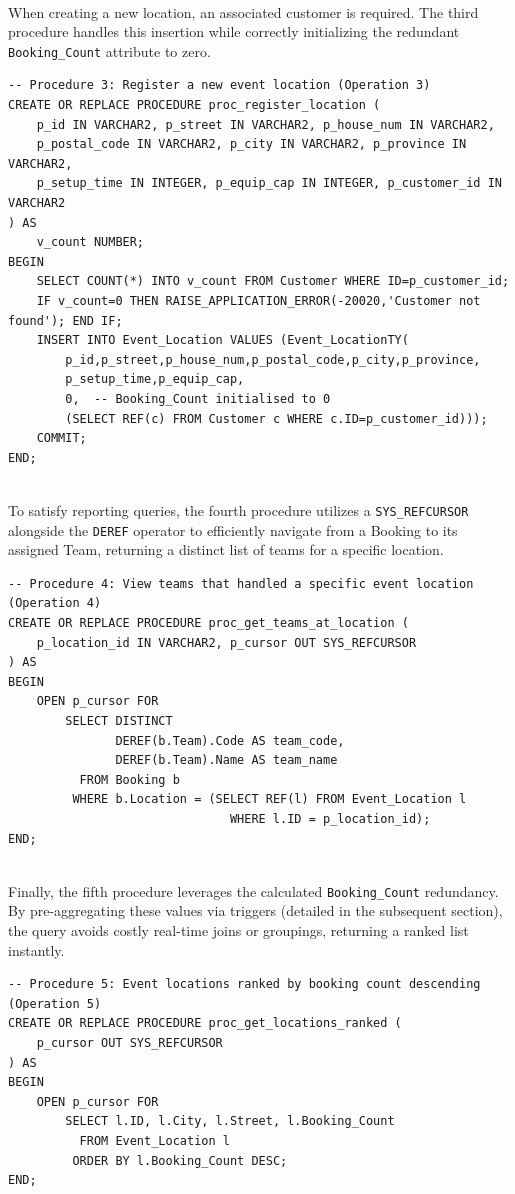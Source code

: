 \documentclass[12pt]{article}
\begin{document}
\\
When creating a new location, an associated customer is required. The third procedure handles this insertion while correctly initializing the redundant \texttt{Booking\_Count} attribute to zero.
\\
\begin{lstlisting}
-- Procedure 3: Register a new event location (Operation 3)
CREATE OR REPLACE PROCEDURE proc_register_location (
    p_id IN VARCHAR2, p_street IN VARCHAR2, p_house_num IN VARCHAR2,
    p_postal_code IN VARCHAR2, p_city IN VARCHAR2, p_province IN VARCHAR2,
    p_setup_time IN INTEGER, p_equip_cap IN INTEGER, p_customer_id IN VARCHAR2
) AS
    v_count NUMBER;
BEGIN
    SELECT COUNT(*) INTO v_count FROM Customer WHERE ID=p_customer_id;
    IF v_count=0 THEN RAISE_APPLICATION_ERROR(-20020,'Customer not found'); END IF;
    INSERT INTO Event_Location VALUES (Event_LocationTY(
        p_id,p_street,p_house_num,p_postal_code,p_city,p_province,
        p_setup_time,p_equip_cap,
        0,  -- Booking_Count initialised to 0
        (SELECT REF(c) FROM Customer c WHERE c.ID=p_customer_id)));
    COMMIT;
END;
\end{lstlisting}
\\
To satisfy reporting queries, the fourth procedure utilizes a \texttt{SYS\_REFCURSOR} alongside the \texttt{DEREF} operator to efficiently navigate from a Booking to its assigned Team, returning a distinct list of teams for a specific location.
\\
\begin{lstlisting}
-- Procedure 4: View teams that handled a specific event location (Operation 4)
CREATE OR REPLACE PROCEDURE proc_get_teams_at_location (
    p_location_id IN VARCHAR2, p_cursor OUT SYS_REFCURSOR
) AS
BEGIN
    OPEN p_cursor FOR
        SELECT DISTINCT
               DEREF(b.Team).Code AS team_code,
               DEREF(b.Team).Name AS team_name
          FROM Booking b
         WHERE b.Location = (SELECT REF(l) FROM Event_Location l
                               WHERE l.ID = p_location_id);
END;
\end{lstlisting}
\\
Finally, the fifth procedure leverages the calculated \texttt{Booking\_Count} redundancy. By pre-aggregating these values via triggers (detailed in the subsequent section), the query avoids costly real-time joins or groupings, returning a ranked list instantly.
\\
\begin{lstlisting}
-- Procedure 5: Event locations ranked by booking count descending (Operation 5)
CREATE OR REPLACE PROCEDURE proc_get_locations_ranked (
    p_cursor OUT SYS_REFCURSOR
) AS
BEGIN
    OPEN p_cursor FOR
        SELECT l.ID, l.City, l.Street, l.Booking_Count
          FROM Event_Location l
         ORDER BY l.Booking_Count DESC;
END;
\end{lstlisting}
\end{document}
